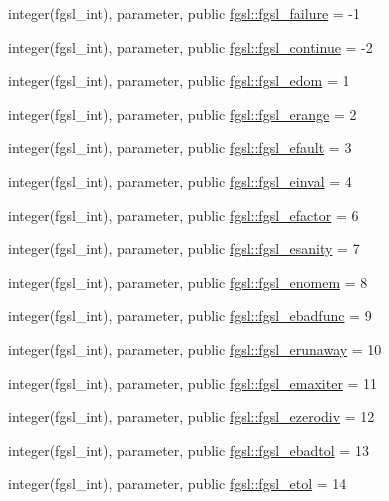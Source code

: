 \begin{DoxyCompactItemize}
\item 
integer(fgsl\+\_\+int), parameter, public \hyperlink{namespacefgsl_a4cb2b20fedfc04419dd412d3bdc635e0}{fgsl\+::fgsl\+\_\+failure} = -\/1
\item 
integer(fgsl\+\_\+int), parameter, public \hyperlink{namespacefgsl_adaee86adbad23b6853659f6564d6c46b}{fgsl\+::fgsl\+\_\+continue} = -\/2
\item 
integer(fgsl\+\_\+int), parameter, public \hyperlink{namespacefgsl_a4a331f3c353a431cb6975bbe8e0cbf63}{fgsl\+::fgsl\+\_\+edom} = 1
\item 
integer(fgsl\+\_\+int), parameter, public \hyperlink{namespacefgsl_a25790738744df3ed3e0b2d50d9b30976}{fgsl\+::fgsl\+\_\+erange} = 2
\item 
integer(fgsl\+\_\+int), parameter, public \hyperlink{namespacefgsl_a3866fec8a527d4830fa9b88464c52417}{fgsl\+::fgsl\+\_\+efault} = 3
\item 
integer(fgsl\+\_\+int), parameter, public \hyperlink{namespacefgsl_a720540845b1b10b1af117475a2b5f2c7}{fgsl\+::fgsl\+\_\+einval} = 4
\item 
integer(fgsl\+\_\+int), parameter, public \hyperlink{namespacefgsl_a027973d6b14562a967273973aed85e4f}{fgsl\+::fgsl\+\_\+efactor} = 6
\item 
integer(fgsl\+\_\+int), parameter, public \hyperlink{namespacefgsl_a9dc60d8f0ce30b7b328d703d09a0e987}{fgsl\+::fgsl\+\_\+esanity} = 7
\item 
integer(fgsl\+\_\+int), parameter, public \hyperlink{namespacefgsl_a70b026317b5a6f797b14978468ca01d9}{fgsl\+::fgsl\+\_\+enomem} = 8
\item 
integer(fgsl\+\_\+int), parameter, public \hyperlink{namespacefgsl_aee7266f310ad4022066e6fe82eecc0f9}{fgsl\+::fgsl\+\_\+ebadfunc} = 9
\item 
integer(fgsl\+\_\+int), parameter, public \hyperlink{namespacefgsl_a89dc8311615f753f8b0b83a60e5f16c0}{fgsl\+::fgsl\+\_\+erunaway} = 10
\item 
integer(fgsl\+\_\+int), parameter, public \hyperlink{namespacefgsl_a5e63249fa198903f233261cb159a3e28}{fgsl\+::fgsl\+\_\+emaxiter} = 11
\item 
integer(fgsl\+\_\+int), parameter, public \hyperlink{namespacefgsl_a13b65889d69077a99a6f13522883061f}{fgsl\+::fgsl\+\_\+ezerodiv} = 12
\item 
integer(fgsl\+\_\+int), parameter, public \hyperlink{namespacefgsl_a3df3fe39582721655da00574f4b021d1}{fgsl\+::fgsl\+\_\+ebadtol} = 13
\item 
integer(fgsl\+\_\+int), parameter, public \hyperlink{namespacefgsl_a7e4da7bbb4435c2bceff8cf57d554015}{fgsl\+::fgsl\+\_\+etol} = 14

\end{DoxyCompactItemize}
